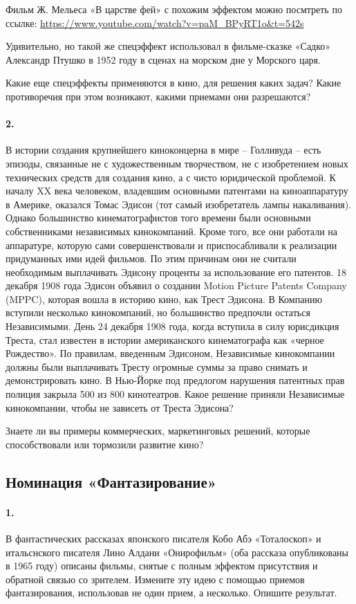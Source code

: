 \documentclass[11pt,a4paper]{article}
\begin{document}
Фильм Ж. Мельеса «В царстве фей» с похожим эффектом можно посмтреть по ссылке:
\url{https://www.youtube.com/watch?v=paM_BPyRT1o&t=542s}

Удивительно, но такой же спецэффект использовал в фильме-сказке «Садко»
Александр Птушко в 1952 году в сценах на морском дне у Морского царя.

Какие еще спецэффекты применяются в кино, для решения каких задач? Какие
противоречия при этом возникают, какими приемами они разрешаются?

\paragraph{2.}
В истории создания крупнейшего киноконцерна в мире – Голливуда – есть эпизоды,
связанные не с художественным творчеством, не с изобретением новых технических
средств для создания кино, а с чисто юридической проблемой. К началу XX века
человеком, владевшим основными патентами на киноаппаратуру в Америке, оказался
Томас Эдисон (тот самый изобретатель лампы накаливания). Однако большинство
кинематографистов того времени были основными собственниками независимых
кинокомпаний. Кроме того, все они работали на аппаратуре, которую сами
совершенствовали и приспосабливали к реализации придуманных ими идей
фильмов. По этим причинам они не считали необходимым выплачивать Эдисону
проценты за использование его патентов. 18 декабря 1908 года Эдисон объявил о
создании Motion Picture Patents Company (MPPC), которая вошла в историю кино,
как Трест Эдисона. В Компанию вступили несколько кинокомпаний, но большинство
предпочли остаться Независимыми. День 24 декабря 1908 года, когда вступила в
силу юрисдикция Треста, стал известен в истории американского кинематографа
как «черное Рождество». По правилам, введенным Эдисоном, Независимые
кинокомпании должны были выплачивать Тресту огромные суммы за право снимать и
демонстрировать кино. В Нью-Йорке под предлогом нарушения патентных прав
полиция закрыла 500 из 800 кинотеатров. Какое решение приняли Независимые
кинокомпании, чтобы не зависеть от Треста Эдисона?

Знаете ли вы примеры коммерческих, маркетинговых решений, которые
способствовали или тормозили развитие кино?

\subsection*{Номинация «Фантазирование»}

\paragraph{1.}
В фантастических рассказах японского писателя Кобо Абэ «Тоталоскоп» и
итальснского писателя Лино Алдани «Онирофильм» (оба рассказа опубликованы в
1965 году) описаны фильмы, снятые с полным эффектом присутствия и обратной
связью со зрителем. Измените эту идею с помощью приемов фантазирования,
использовав не один прием, а несколько. Опишите результат.
\end{document}
